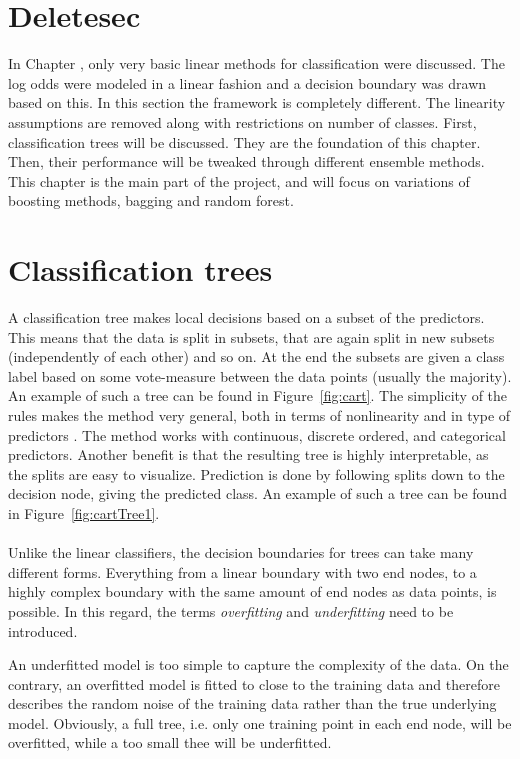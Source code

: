 \section{Deletesec}
In Chapter , only very basic linear methods for classification were discussed. The log odds were modeled in a linear fashion and a decision boundary was drawn based on this. In this section the framework is completely different. The linearity assumptions are removed along with restrictions on number of classes. 
First, classification trees will be discussed. They are the foundation of this chapter. Then, their performance will be tweaked through different ensemble methods. This chapter is the main part of the project, and will focus on variations of boosting methods, bagging and random forest. 
%
\section{Classification trees}
\label{sec:Classification trees}
A classification tree makes local decisions based on a subset of the predictors. This means that the data is split in subsets, that are again split in new subsets (independently of each other) and so on. 
At the end the subsets are given a class label based on some vote-measure between the data points (usually the majority).
An example of such a tree can be found in Figure~\ref{fig:cart}.
The simplicity of the rules makes the method very general, both in terms of nonlinearity and in type of predictors . The method works with continuous, discrete ordered, and categorical predictors. Another benefit is that the resulting tree is highly interpretable, as the splits are easy to visualize. Prediction is done by following splits down to the decision node, giving the predicted class. An example of such a tree can be found in Figure~\ref{fig:cartTree1}.\\
\\
Unlike the linear classifiers, the decision boundaries for trees can take many different forms. Everything from a linear boundary with two end nodes, to a highly complex boundary with the same amount of end nodes as data points, is possible. In this regard, the terms \textit{overfitting} and \textit{underfitting} need to be introduced. 

An underfitted model is too simple to capture the complexity of the data. On the contrary, an overfitted model is fitted to close to the training data and therefore describes the random noise of the training data rather than the true underlying model.  Obviously, a full tree, i.e. only one training point in each end node, will be overfitted, while a too small thee will be underfitted. 

